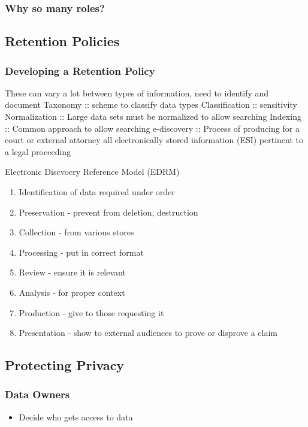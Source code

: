 \documentclass[11pt]{article}
\begin{document}
\subsubsection{Why so many roles?}
\label{sec:orgabb5cbd}

\subsection{Retention Policies}
\label{sec:orge72fce3}
\subsubsection{Developing a Retention Policy}
\label{sec:org6e02c21}
These can vary a lot between types of information, need to identify and document
Taxonomy :: scheme to classify data types
Classification :: sensitivity
Normalization :: Large data sets must be normalized to allow searching
Indexing :: Common approach to allow searching
e-discovery :: Process of producing for a court or external attorney all electronically stored information (ESI) pertinent to a legal proceeding

Electronic Discvoery Reference Model (EDRM) 
\begin{enumerate}
\item Identification of data required under order
\item Preservation - prevent from deletion, destruction
\item Collection - from various stores
\item Processing - put in correct format
\item Review - ensure it is relevant
\item Analysis - for proper context
\item Production - give to those requesting it
\item Presentation - show to external audiences to prove or disprove a claim
\end{enumerate}
\subsection{Protecting Privacy}
\label{sec:org70f279e}
\subsubsection{Data Owners}
\label{sec:org9aa18c6}
\begin{itemize}
\item Decide who gets access to data
\end{itemize}
\end{document}
